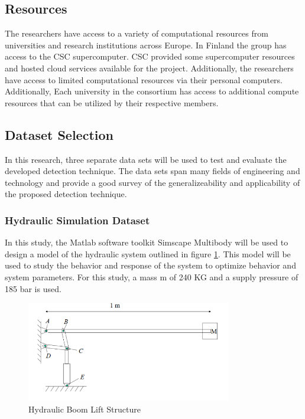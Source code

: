\subsection{Resources}

The researchers have access to a variety of computational resources from universities and research institutions across Europe. In Finland the group has access to the CSC supercomputer. CSC provided some supercomputer resources and hosted cloud services available for the project. Additionally, the researchers have access to limited computational resources via their personal computers. Additionally, Each university in the consortium has access to additional compute resources that can be utilized by their respective members.

\subsection{Dataset Selection}
\label{ref_datasets}

In this research, three separate data sets will be used to test and evaluate the developed detection technique. The data sets span many fields of engineering and technology and provide a good survey of the generalizeability and applicability of the proposed detection technique.  

\subsubsection{Hydraulic Simulation Dataset}
\label{ref_hydraulic_dataset}

In this study, the Matlab software toolkit Simscape Multibody will be used to design a model of the hydraulic system outlined in figure \ref{fig:boom_structure}. This model will be used to study the behavior and response of the system to optimize behavior and system parameters. For this study, a mass m of 240 KG and a supply pressure of 185 bar is used.

\begin{figure}[H]
    \includegraphics[width=0.8\textwidth]{1_hydraulic_sim/BoomStructure.PNG}
    \caption{Hydraulic Boom Lift Structure}
    \label{fig:boom_structure}
\end{figure}


